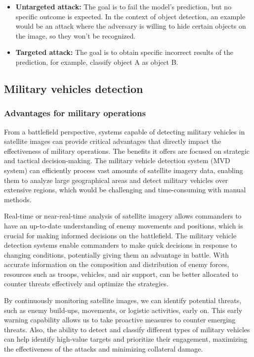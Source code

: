 \documentclass[14pt,a4paper]{extarticle}
\newcounter{e}
\numberwithin{equation}{section}
\numberwithin{figure}{section}
\begin{document}
\begin{itemize}
    \item \textbf{Untargeted attack:} The goal is to fail the model’s prediction, but no specific outcome is expected. In the context of object detection, an example would be an attack where the adversary is willing to hide certain objects on the image, so they won’t be recognized.
    \item \textbf{Targeted attack:} The goal is to obtain specific incorrect results of the prediction, for example, classify object A as object B.
\end{itemize}



\subsection{Military vehicles detection}
\subsubsection{Advantages for military operations}
From a battlefield perspective, systems capable of detecting military vehicles in satellite images can provide critical advantages that directly impact the effectiveness of military operations. The benefits it offers are focused on strategic and tactical decision-making. The military vehicle detection system (MVD system) can efficiently process vast amounts of satellite imagery data, enabling them to analyze large geographical areas and detect military vehicles over extensive regions, which would be challenging and time-consuming with manual methods.

Real-time or near-real-time analysis of satellite imagery allows commanders to have an up-to-date understanding of enemy movements and positions, which is crucial for making informed decisions on the battlefield. The military vehicle detection systems enable commanders to make quick decisions in response to changing conditions, potentially giving them an advantage in battle. With accurate information on the composition and distribution of enemy forces, resources such as troops, vehicles, and air support, can be better allocated to counter threats effectively and optimize the strategies.

By continuously monitoring satellite images, we can identify potential threats, such as enemy build-ups, movements, or logistic activities, early on. This early warning capability allows us to take proactive measures to counter emerging threats. Also, the ability to detect and classify different types of military vehicles can help  identify high-value targets and prioritize their engagement, maximizing the effectiveness of the attacks and minimizing collateral damage.
\end{document}

